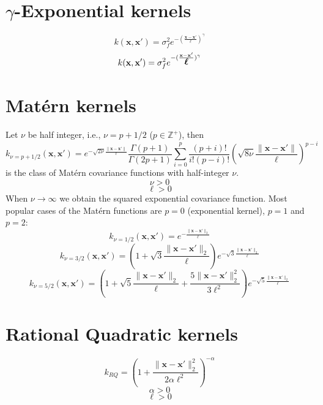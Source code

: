 \documentclass[a4paper,11pt]{article}
\newcommand\x{{\mathbf x}}
\newcommand\K{{\mathbf K}}
\newcommand\ELL{{\Ivec \ell}}
\newcommand{\Ivec}[1]{\mbox{\boldmath $#1$}}
\begin{document}
\section{$\gamma$-Exponential kernels}
$$k(\x,\x') = \sigma_f^2 e^{-(\frac{\x-\x'}{\ell})^\gamma}$$
$$k(\x,\x') = \sigma_f^2 e^{-(\frac{\x-\x'}{\ELL})^\gamma}$$

\section{Mat\'ern kernels}
Let $\nu$ be half integer, i.e., $\nu = p + 1/2$ ($p \in
\mathbb{Z}^+$), then
$$k_{\nu=p+1/2}(\x,\x') = e^{-\sqrt{2\nu}\frac{\|\x-\x'\|}{\ell}}
\frac{\Gamma(p+1)}{\Gamma(2p+1)} \sum_{i=0}^p
\frac{(p+i)!}{i!(p-i)!}\left(\sqrt{8\nu}\frac{\|\x-\x'\|}{\ell}\right)^{p-i}$$
is the class of Mat\'ern covariance functions with half-integer $\nu$.
$$\nu > 0$$
$$\ell > 0$$
When $\nu \rightarrow \infty$ we obtain the squared exponential
covariance function. Most popular cases of the Mat\'ern functions are
$p=0$ (exponential kernel), $p=1$ and $p=2$:
$$k_{\nu=1/2}(\x,\x') = e^{-\frac{\|\x-\x'\|_2}{\ell}}$$
$$k_{\nu=3/2}(\x,\x') = \left(1+\sqrt{3}\frac{\|\x-\x'\|_2}{\ell}
\right) e^{-\sqrt{3}\frac{\|\x-\x'\|_2}{\ell}}$$ 
$$k_{\nu=5/2}(\x,\x') = \left(1+\sqrt{5}\frac{\|\x-\x'\|_2}{\ell}
 + \frac{5\|\x-\x'\|_2^2}{3\ell^2}\right)
e^{-\sqrt{5}\frac{\|\x-\x'\|_2}{\ell}}$$


\section{Rational Quadratic kernels}
$$k_{RQ} = \left(1+\frac{\|\x-\x'\|_2^2}{2\alpha\ell^2}
\right)^{-\alpha}$$
$$\alpha > 0$$
$$\ell > 0$$
\end{document}
